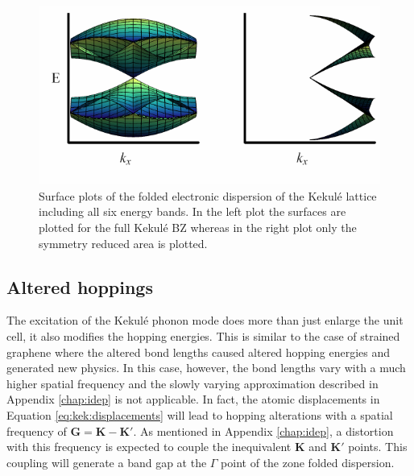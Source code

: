 \begin{figure}
	\begin{center}
	\includegraphics{Figs_Kekule/ZoneFolded.pdf}
	\end{center}
	\caption[Surface plots of the folded electronic dispersion of the Kekul\'e lattice]{\label{fig:kek:zfdisp}
		Surface plots of the folded electronic dispersion of the Kekul\'e lattice including all six energy bands.
		In the left plot the surfaces are plotted for the full Kekul\'e BZ whereas in the right plot only the symmetry reduced area is plotted.
	}
\end{figure}

\subsection{Altered hoppings}
The excitation of the Kekul\'e phonon mode does more than just enlarge the unit cell, it also modifies the hopping energies.
This is similar to the case of strained graphene where the altered bond lengths caused altered hopping energies and generated new physics.
In this case, however, the bond lengths vary with a much higher spatial frequency and the slowly varying approximation described in Appendix \ref{chap:idep} is not applicable.
In fact, the atomic displacements in Equation \ref{eq:kek:displacements} will lead to hopping alterations with a spatial frequency of $\bm{G}=\bm{K}-\bm{K'}$.
As mentioned in Appendix \ref{chap:idep}, a distortion with this frequency is expected to couple the inequivalent $\bm{K}$ and $\bm{K'}$ points.
This coupling will generate a band gap at the $\Gamma$ point of the zone folded dispersion.

